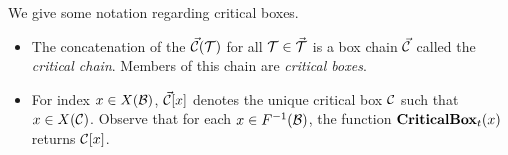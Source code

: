 \documentclass{acmsmall}
\newcommand{\cB}{{\cal B}}
\newcommand{\cC}{{\cal C}}
\newcommand{\cF}{{\cal F}}
\newcommand{\cL}{{\cal L}}
\newcommand{\cT}{{\cal T}}
\newcommand{\lis}{{\tt lis}}
\newcommand{\loss}{{\tt loss}}
\newcommand{\alis}{{\tt alis}}
\newcommand{\lisloss}{\lambda}
\newcommand{\classify}{{\rm {\bf Classify}}}
\newcommand{\approxlis}{{\rm {\bf ApproxLIS}}}
\newcommand{\critbox}{{\rm {\bf CriticalBox}}}
\begin{document}
 We give some notation regarding critical boxes.
\begin{itemize}
	\item The concatenation of the $\vec{\cC}(\cT)$ for all $\cT \in \vec{\cT}$ is a box chain $\vec{\cC}$ called the {\em critical chain}. Members of this chain are {\em critical boxes}.
	\item For index $x  \in X(\cB)$, $\vec{\cC}[x]$ denotes the unique critical box $\cC$ such that $x \in X(\cC)$.
	Observe that for each $x \in F^{-1}(\cB)$, the function $\critbox_t(x)$ returns $\cC[x]$.
\end{itemize}
\end{document}
